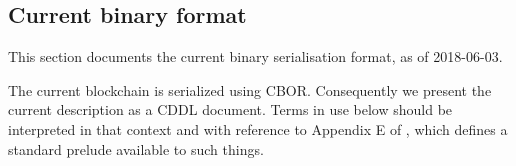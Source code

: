 \documentclass{article}
\newcommand{\hstype}[1]{\textbf{#1}}
\newcommand{\String}{\hstype{String}}
\newcommand{\Bytes}{\hstype{Bytes}}
\begin{document}
\begin{appendices}
  \section{Current binary format}
  \label{sec:currentfmt}

  This section documents the current binary serialisation format, as of
  2018-06-03.

  The current blockchain is serialized using CBOR\cite{cbor}. Consequently we
  present the current description as a CDDL\cite{cddl} document. Terms in use
  below should be interpreted in that context and with reference to Appendix E
  of \cite{cddl}, which defines a standard prelude available to such things.





  

\end{appendices}
\end{document}

